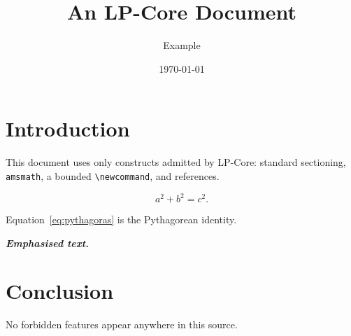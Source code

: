 \documentclass{article}
\title{An LP-Core Document}
\author{Example}
\date{\today}
\newcommand{\doublewide}[1]{\textbf{\textit{#1}}}
\begin{document}
\maketitle

\section{Introduction}
This document uses only constructs admitted by LP-Core: standard
sectioning, \texttt{amsmath}, a bounded \verb|\newcommand|, and
references.

\begin{equation}
  \label{eq:pythagoras}
  a^2 + b^2 = c^2.
\end{equation}

Equation~\eqref{eq:pythagoras} is the Pythagorean identity.

\doublewide{Emphasised text.}

\section{Conclusion}
No forbidden features appear anywhere in this source.
\end{document}
